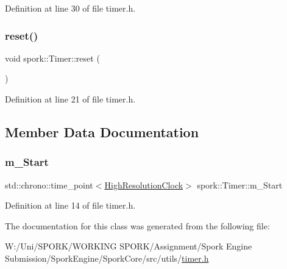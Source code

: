 Definition at line 30 of file timer.\+h.

\mbox{\label{classspork_1_1_timer_a2edd31761d6ffbee37fbcb19abae7397}} 
\subsubsection{\texorpdfstring{reset()}{reset()}}
{\footnotesize\ttfamily void spork\+::\+Timer\+::reset (\begin{DoxyParamCaption}{ }\end{DoxyParamCaption})\hspace{0.3cm}{\ttfamily [inline]}}



Definition at line 21 of file timer.\+h.



\subsection{Member Data Documentation}
\mbox{\label{classspork_1_1_timer_af76f0cbd99ac86c2d792f0d48b7013a7}} 
\subsubsection{\texorpdfstring{m\+\_\+\+Start}{m\_Start}}
{\footnotesize\ttfamily std\+::chrono\+::time\+\_\+point$<$\hyperlink{classspork_1_1_timer_aa9dbba26ef2e26de57cfcd4294630387}{High\+Resolution\+Clock}$>$ spork\+::\+Timer\+::m\+\_\+\+Start\hspace{0.3cm}{\ttfamily [private]}}



Definition at line 14 of file timer.\+h.



The documentation for this class was generated from the following file\+:\begin{DoxyCompactItemize}
\item 
W\+:/\+Uni/\+S\+P\+O\+R\+K/\+W\+O\+R\+K\+I\+N\+G S\+P\+O\+R\+K/\+Assignment/\+Spork Engine Submission/\+Spork\+Engine/\+Spork\+Core/src/utils/\hyperlink{timer_8h}{timer.\+h}\end{DoxyCompactItemize}
